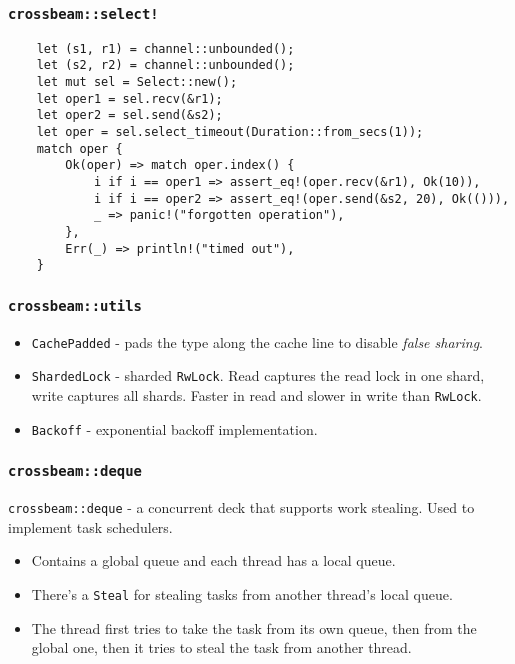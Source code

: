 \documentclass[aspectratio=1610,t]{beamer}
\begin{document}

\begin{frame}[fragile]
\frametitle{\texttt{crossbeam::select!}}
\begin{verbatim}
    let (s1, r1) = channel::unbounded();
    let (s2, r2) = channel::unbounded();
    let mut sel = Select::new();
    let oper1 = sel.recv(&r1);
    let oper2 = sel.send(&s2);
    let oper = sel.select_timeout(Duration::from_secs(1));
    match oper {
        Ok(oper) => match oper.index() {
            i if i == oper1 => assert_eq!(oper.recv(&r1), Ok(10)),
            i if i == oper2 => assert_eq!(oper.send(&s2, 20), Ok(())),
            _ => panic!("forgotten operation"),
        },
        Err(_) => println!("timed out"),
    }
\end{verbatim}
\end{frame}


\begin{frame}[fragile]
\frametitle{\texttt{crossbeam::utils}}
\begin{itemize}
    \item<1-> \texttt{CachePadded} - pads the type along the cache line to disable \textit{false sharing}.
    \item<2-> \texttt{ShardedLock} - sharded \texttt{RwLock}. Read captures the read lock in one shard, write captures all shards. Faster in read and slower in write than \texttt{RwLock}.
    \item<3-> \texttt{Backoff} - exponential backoff implementation.
\end{itemize}
\end{frame}


\begin{frame}[fragile]
\frametitle{\texttt{crossbeam::deque}}
\texttt{crossbeam::deque} - a concurrent deck that supports work stealing. Used to implement task schedulers.
\begin{itemize} 
    \item<2-> Contains a global queue and each thread has a local queue.
    \item<3-> There's a \texttt{Steal} for stealing tasks from another thread's local queue.
    \item<4-> The thread first tries to take the task from its own queue, then from the global one, then it tries to steal the task from another thread.
\end{itemize}
\end{frame}
\end{document}
